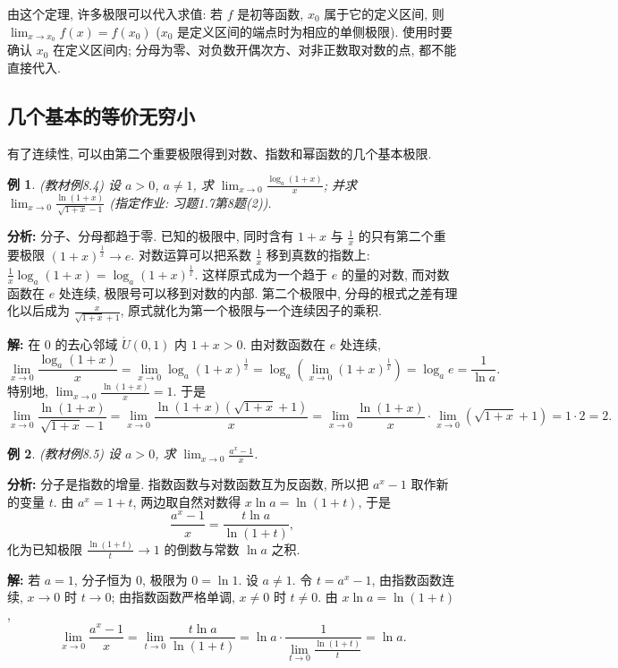 \documentclass[UTF8,openany]{ctexbook}
\theoremstyle{chinesetextbook}
\newtheorem{example}{例}[section]
\newenvironment{cnsolution}{\par\indent\textbf{解:} \ignorespaces}{\par}
\begin{document}
由这个定理, 许多极限可以代入求值: 若 $f$ 是初等函数, $x_0$ 属于它的定义区间, 则 $\displaystyle\lim_{x\to x_0}f(x)=f(x_0)$ ($x_0$ 是定义区间的端点时为相应的单侧极限). 使用时要确认 $x_0$ 在定义区间内; 分母为零、对负数开偶次方、对非正数取对数的点, 都不能直接代入.
\subsection{几个基本的等价无穷小}
有了连续性, 可以由第二个重要极限得到对数、指数和幂函数的几个基本极限.
\begin{example}\label{ex:8-4}
\textnormal{(教材例8.4)} 设 $a>0$, $a\ne1$, 求 $\displaystyle\lim_{x\to0}\frac{\log_a(1+x)}x$; 并求 $\displaystyle\lim_{x\to0}\frac{\ln(1+x)}{\sqrt{1+x}-1}$ (指定作业: 习题1.7第8题(2)).
\end{example}
\par\indent\textbf{分析:} 分子、分母都趋于零. 已知的极限中, 同时含有 $1+x$ 与 $\displaystyle\frac1x$ 的只有第二个重要极限 $(1+x)^{\frac1x}\to e$. 对数运算可以把系数 $\displaystyle\frac1x$ 移到真数的指数上: $\displaystyle\frac1x\log_a(1+x)=\log_a(1+x)^{\frac1x}$. 这样原式成为一个趋于 $e$ 的量的对数, 而对数函数在 $e$ 处连续, 极限号可以移到对数的内部. 第二个极限中, 分母的根式之差有理化以后成为 $\displaystyle\frac x{\sqrt{1+x}+1}$, 原式就化为第一个极限与一个连续因子的乘积.
\begin{cnsolution}
在 $0$ 的去心邻域 $\mathring U(0,1)$ 内 $1+x>0$. 由对数函数在 $e$ 处连续,
\[
\lim_{x\to0}\frac{\log_a(1+x)}x=\lim_{x\to0}\log_a(1+x)^{\frac1x}=\log_a\left(\lim_{x\to0}(1+x)^{\frac1x}\right)=\log_ae=\frac1{\ln a}.
\]
特别地, $\displaystyle\lim_{x\to0}\frac{\ln(1+x)}x=1$. 于是
\[
\lim_{x\to0}\frac{\ln(1+x)}{\sqrt{1+x}-1}=\lim_{x\to0}\frac{\ln(1+x)\left(\sqrt{1+x}+1\right)}x=\lim_{x\to0}\frac{\ln(1+x)}x\cdot\lim_{x\to0}\left(\sqrt{1+x}+1\right)=1\cdot2=2.
\]
\end{cnsolution}
\begin{example}\label{ex:8-5}
\textnormal{(教材例8.5)} 设 $a>0$, 求 $\displaystyle\lim_{x\to0}\frac{a^x-1}x$.
\end{example}
\par\indent\textbf{分析:} 分子是指数的增量. 指数函数与对数函数互为反函数, 所以把 $a^x-1$ 取作新的变量 $t$. 由 $a^x=1+t$, 两边取自然对数得 $x\ln a=\ln(1+t)$, 于是
\[
\frac{a^x-1}x=\frac{t\ln a}{\ln(1+t)},
\]
化为已知极限 $\displaystyle\frac{\ln(1+t)}t\to1$ 的倒数与常数 $\ln a$ 之积.
\begin{cnsolution}
若 $a=1$, 分子恒为 $0$, 极限为 $0=\ln1$. 设 $a\ne1$. 令 $t=a^x-1$, 由指数函数连续, $x\to0$ 时 $t\to0$; 由指数函数严格单调, $x\ne0$ 时 $t\ne0$. 由 $x\ln a=\ln(1+t)$,
\[
\lim_{x\to0}\frac{a^x-1}x=\lim_{t\to0}\frac{t\ln a}{\ln(1+t)}=\ln a\cdot\frac1{\displaystyle\lim_{t\to0}\frac{\ln(1+t)}t}=\ln a.
\]
\end{cnsolution}
\end{document}

